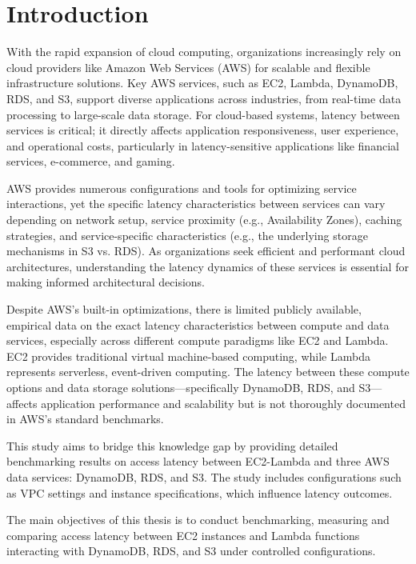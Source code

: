 \section{Introduction}
\label{cha:intro}

With the rapid expansion of cloud computing, organizations increasingly rely on cloud providers like Amazon Web Services (AWS) for scalable and flexible infrastructure solutions. Key AWS services, such as EC2, Lambda, DynamoDB, RDS, and S3, support diverse applications across industries, from real-time data processing to large-scale data storage. For cloud-based systems, latency between services is critical; it directly affects application responsiveness, user experience, and operational costs, particularly in latency-sensitive applications like financial services, e-commerce, and gaming.

AWS provides numerous configurations and tools for optimizing service interactions, yet the specific latency characteristics between services can vary depending on network setup, service proximity (e.g., Availability Zones), caching strategies, and service-specific characteristics (e.g., the underlying storage mechanisms in S3 vs. RDS). As organizations seek efficient and performant cloud architectures, understanding the latency dynamics of these services is essential for making informed architectural decisions.

Despite AWS’s built-in optimizations, there is limited publicly available, empirical data on the exact latency characteristics between compute and data services, especially across different compute paradigms like EC2 and Lambda. EC2 provides traditional virtual machine-based computing, while Lambda represents serverless, event-driven computing. The latency between these compute options and data storage solutions—specifically DynamoDB, RDS, and S3—affects application performance and scalability but is not thoroughly documented in AWS’s standard benchmarks.

This study aims to bridge this knowledge gap by providing detailed benchmarking results on access latency between EC2-Lambda and three AWS data services: DynamoDB, RDS, and S3. The study includes configurations such as VPC settings and instance specifications, which influence latency outcomes.

The main objectives of this thesis is to conduct benchmarking, measuring and comparing access latency between EC2 instances and Lambda functions interacting with DynamoDB, RDS, and S3 under controlled configurations.

